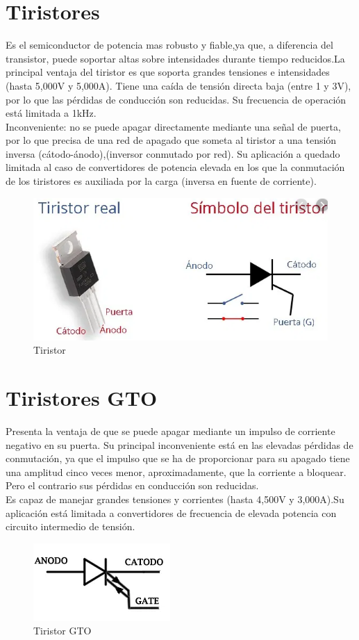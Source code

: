 \documentclass[12pt,a4paper]{article}
\begin{document}
\section*{Tiristores}
Es el semiconductor de potencia mas robusto y fiable,ya que, a diferencia del transistor, puede soportar altas sobre intensidades durante tiempo reducidos.La principal ventaja del tiristor es que soporta grandes tensiones e intensidades (hasta 5,000V y 5,000A). Tiene una caída de tensión directa baja (entre 1 y 3V), por lo que las pérdidas de conducción son reducidas. Su frecuencia de operación está limitada a 1kHz.\\
Inconveniente: no se puede apagar directamente mediante una señal de puerta, por lo que precisa de una red de apagado que someta al tiristor a una tensión inversa (cátodo-ánodo),(inversor conmutado por red). Su aplicación a quedado limitada al caso de convertidores de potencia elevada en los que la conmutación de los tiristores es auxiliada por la carga (inversa en fuente de corriente).
\begin{figure}[hbtp]
\centering
\includegraphics[scale=0.7]{Circuitos/Tiristor.png}
\caption{Tiristor}
\end{figure}

\section*{Tiristores GTO}
Presenta la ventaja de que se puede apagar mediante un impulso de corriente negativo en su puerta. Su principal inconveniente está en las elevadas pérdidas de conmutación, ya que el impulso que se ha de proporcionar para su apagado tiene una amplitud cinco veces menor, aproximadamente, que la corriente a bloquear. Pero el contrario sus pérdidas en conducción son reducidas.\\
Es capaz de manejar grandes tensiones y corrientes (hasta 4,500V y 3,000A).Su aplicación está limitada a convertidores de frecuencia de elevada potencia con circuito intermedio de tensión.
\begin{figure}[hbtp]
\centering
\includegraphics[scale=0.7]{Circuitos/TiristorGTO.png}
\caption{Tiristor GTO}
\end{figure}
\end{document}
